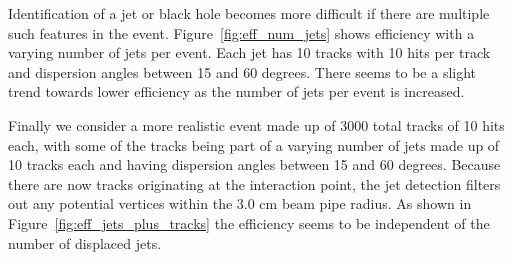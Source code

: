 \documentclass{JINST}
\begin{document}
Identification of a jet or black hole becomes more difficult if there are multiple such features in the event.  Figure~\ref{fig:eff_num_jets} shows efficiency with a varying number of jets per event.  Each jet has 10 tracks with 10 hits per track and dispersion angles between 15 and 60 degrees.  There seems to be a slight trend towards lower efficiency as the number of jets per event is increased.

Finally we consider a more realistic event made up of 3000 total tracks of 10 hits each, with some of the tracks being part of a varying number of jets made up of 10 tracks each and having dispersion angles between 15 and 60 degrees.  Because there are now tracks originating at the interaction point, the jet detection filters out any potential vertices within the 3.0 cm beam pipe radius.  As shown in Figure~\ref{fig:eff_jets_plus_tracks} the efficiency seems to be independent of the number of displaced jets.
%
\end{document}
